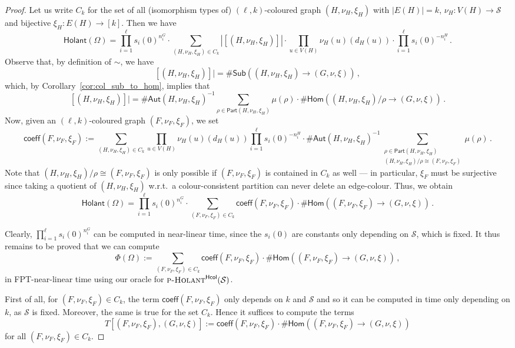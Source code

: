 \documentclass[authorcolumns,numberwithinsect]{no-lipics-v2022}
\newcommand{\homs}[2]{\mathsf{Hom}(#1 \to #2)}
\newcommand{\auts}{\mathsf{Aut}}
\newcommand{\subs}[2]{\mathsf{Sub}(#1 \to #2)}
\newcommand{\ppart}{\ensuremath{\mathsf{Part}}}
\newcommand{\holantprobstar}{\text{\sc{p-Holant}}^{\mathsf{Hcol}}}
\newcommand{\holant}{\mathsf{Holant}}
\begin{document}
\begin{proof}
     Let us write $C_k$ for the set of all (isomorphism types of) $(\ell,k)$-coloured graph $(H,\nu_H,\xi_H)$ with $|E(H)|=k$, $\nu_H: V(H) \to \mathcal{S}$ and bijective $\xi_H: E(H) \to [k]$.
     Then we have
     \[\holant(\Omega)= \prod_{i=1}^\ell s_i(0)^{n^G_i}\cdot \sum_{(H,\nu_H,\xi_H)\in C_k}|[(H,\nu_H,\xi_H)]| \cdot \prod_{u \in V(H)}\nu_H(u)(d_H(u)) \cdot \prod_{i=1}^\ell s_i(0)^{-n^H_i}\,. \]
     Observe that, by definition of $\sim$, we have
     \[ [(H,\nu_H,\xi_H)]| = \#\subs{(H,\nu_H,\xi_H)}{(G,\nu,\xi)} \,,\]
     which, by Corollary~\ref{cor:col_sub_to_hom}, implies that
     \[[(H,\nu_H,\xi_H)]| = \#\auts(H,\nu_H,\xi_H)^{-1} \sum_{\rho \in\ppart(H,\nu_H,\xi_H)} \mu(\rho) \cdot \#\homs{(H,\nu_H,\xi_H)/\rho}{(G,\nu,\xi)} \,.\]
     Now, given an $(\ell,k)$-coloured graph $(F,\nu_F,\xi_F)$, we set
     \[ \mathsf{coeff}(F,\nu_F,\xi_F):= \sum_{(H,\nu_H,\xi_H)\in C_k} \prod_{u \in V(H)}\nu_H(u)(d_H(u)) \prod_{i=1}^\ell s_i(0)^{-n^H_i} \cdot \#\auts(H,\nu_H,\xi_H)^{-1} \sum_{\substack{\rho \in \ppart(H,\nu_H,\xi_H)\\ (H,\nu_H,\xi_H)/\rho \cong (F,\nu_F,\xi_F)}} \mu(\rho)  \,.\]
     Note that $(H,\nu_H,\xi_H)/\rho \cong (F,\nu_F,\xi_F)$ is only possible if $(F,\nu_F,\xi_F)$ is contained in $C_k$ as well --- in particular, $\xi_F$ must be surjective since taking a quotient of $(H,\nu_H,\xi_H)$ w.r.t.\ a colour-consistent partition can never delete an edge-colour. Thus, we obtain
     \begin{equation}
         \holant(\Omega)= \prod_{i=1}^\ell s_i(0)^{n^G_i} \cdot \sum_{(F,\nu_F,\xi_F) \in C_k} \mathsf{coeff}(F,\nu_F,\xi_F) \cdot \#\homs{(F,\nu_F,\xi_F)}{(G,\nu,\xi)}\,.
     \end{equation}

     

     Clearly, $\prod_{i=1}^\ell s_i(0)^{n^G_i}$ can be computed in near-linear time, since the $s_i(0)$ are constants only depending on $\mathcal{S}$, which is fixed. It thus remains to be proved that we can compute 
     \[ \Phi(\Omega):= \sum_{(F,\nu_F,\xi_F)\in C_k} \mathsf{coeff}(F,\nu_F,\xi_F) \cdot \#\homs{(F,\nu_F,\xi_F)}{(G,\nu,\xi)}\,,\]
     in FPT-near-linear time using our oracle for $\holantprobstar(\mathcal{S})$.

     First of all, for $(F,\nu_F,\xi_F)\in C_k$, the term $\mathsf{coeff}(F,\nu_F,\xi_F)$ only depends on $k$ and $\mathcal{S}$ and so it can be computed in time only depending on $k$, as $\mathcal{S}$ is fixed. Moreover, the same is true for the set $C_k$. Hence it suffices to compute the terms \[
     T[(F,\nu_F,\xi_F),(G,\nu,\xi)] := \mathsf{coeff}(F,\nu_F,\xi_F) \cdot \#\homs{(F,\nu_F,\xi_F)}{(G,\nu,\xi)}\] for all $(F,\nu_F,\xi_F)\in C_k$.


\end{proof}
\end{document}
